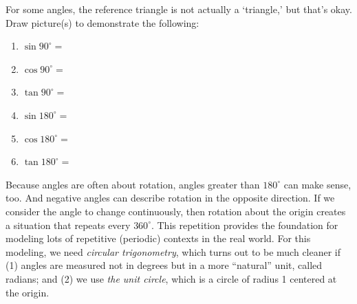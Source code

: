 \begin{prob}
For some angles, the reference triangle is not actually a `triangle,' but that's okay.  Draw picture(s) to demonstrate the following: 
\begin{enumerate}
\item $\sin 90^\circ =$
\item $\cos 90^\circ =$
\item $\tan 90^\circ =$
\item $\sin 180^\circ =$
\item $\cos 180^\circ =$
\item $\tan 180^\circ =$
\end{enumerate}
\end{prob}

%

Because angles are often about rotation, angles greater than $180^\circ$ can make sense, too.  And negative angles can describe rotation in the opposite direction.  If we consider the angle to change continuously, then rotation about the origin creates a situation that repeats every $360^\circ$.  This repetition provides the foundation for modeling lots of repetitive (periodic) contexts in the real world.  For this modeling, we need \emph{circular trigonometry}, which turns out to be much cleaner if (1) angles are measured not in degrees but in a more ``natural'' unit, called radians; and (2) we use \emph{the unit circle}, which is a circle of radius 1 centered at the origin.   

